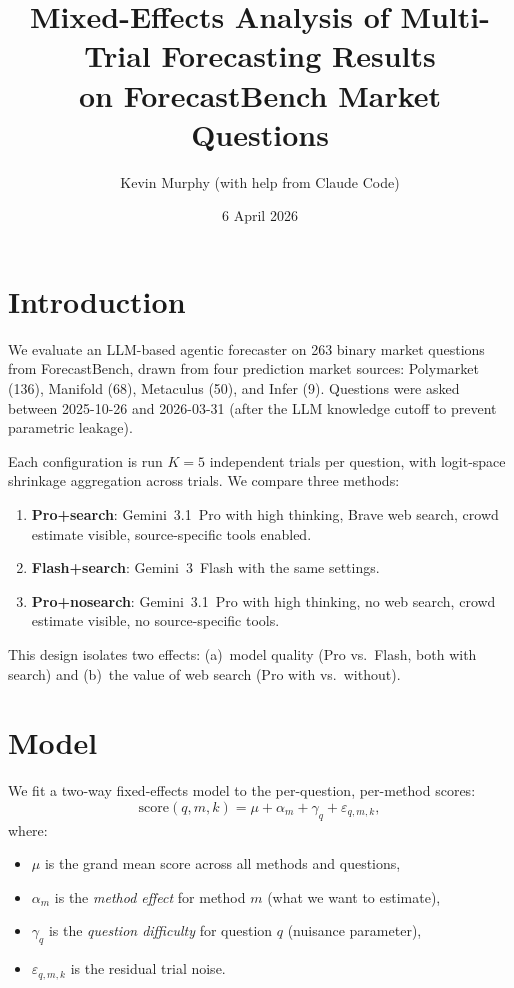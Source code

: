 \documentclass[11pt]{article}
\title{Mixed-Effects Analysis of Multi-Trial Forecasting Results\\
on ForecastBench Market Questions}
\author{Kevin Murphy (with help from Claude Code)}
\date{6 April 2026}
\begin{document}
\maketitle

\section{Introduction}

We evaluate an LLM-based agentic forecaster on 263 binary market questions
from ForecastBench, drawn from four prediction market sources:
Polymarket (136), Manifold (68), Metaculus (50), and Infer (9).
Questions were asked between 2025-10-26 and 2026-03-31 (after the LLM
knowledge cutoff to prevent parametric leakage).

Each configuration is run $K=5$ independent trials per question, with
logit-space shrinkage aggregation across trials.
We compare three methods:
\begin{enumerate}
  \item \textbf{Pro+search}: Gemini~3.1~Pro with high thinking, Brave web
    search, crowd estimate visible, source-specific tools enabled.
  \item \textbf{Flash+search}: Gemini~3~Flash with the same settings.
  \item \textbf{Pro+nosearch}: Gemini~3.1~Pro with high thinking, no web
    search, crowd estimate visible, no source-specific tools.
\end{enumerate}

This design isolates two effects: (a)~model quality (Pro vs.\ Flash,
both with search) and (b)~the value of web search (Pro with vs.\ without).


\section{Model}

We fit a two-way fixed-effects model to the per-question, per-method scores:
\begin{equation}
  \mathrm{score}(q, m, k) = \mu + \alpha_m + \gamma_q + \varepsilon_{q,m,k},
  \label{eq:model}
\end{equation}
where:
\begin{itemize}
  \item $\mu$ is the grand mean score across all methods and questions,
  \item $\alpha_m$ is the \emph{method effect} for method $m$ (what we want to estimate),
  \item $\gamma_q$ is the \emph{question difficulty} for question $q$ (nuisance parameter),
  \item $\varepsilon_{q,m,k}$ is the residual trial noise.
\end{itemize}
\end{document}

